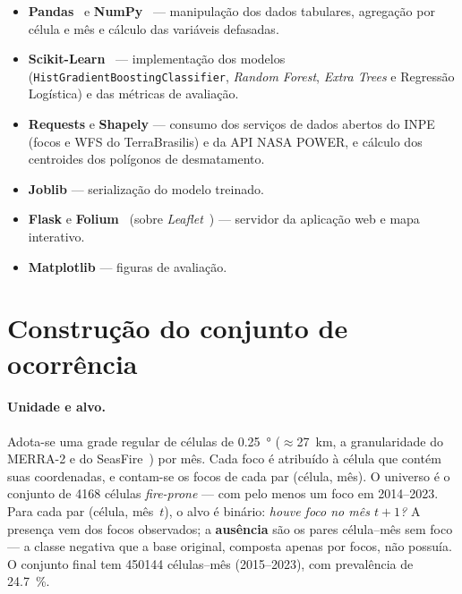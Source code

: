 \documentclass[tcc2]{uftex}
\begin{document}
\begin{itemize}
  \item \textbf{Pandas}~\cite{mckinney2010data} e \textbf{NumPy}~\cite{harris2020numpy} --- manipulação dos dados tabulares, agregação por célula e mês e cálculo das variáveis defasadas.
  \item \textbf{Scikit-Learn}~\cite{pedregosa2011scikit} --- implementação dos modelos (\texttt{HistGradientBoostingClassifier}, \emph{Random Forest}, \emph{Extra Trees} e Regressão Logística) e das métricas de avaliação.
  \item \textbf{Requests} e \textbf{Shapely} --- consumo dos serviços de dados abertos do INPE (focos e WFS do TerraBrasilis) e da API NASA POWER, e cálculo dos centroides dos polígonos de desmatamento.
  \item \textbf{Joblib} --- serialização do modelo treinado.
  \item \textbf{Flask} e \textbf{Folium}~\cite{folium} (sobre \emph{Leaflet}~\cite{leafletjs}) --- servidor da aplicação web e mapa interativo.
  \item \textbf{Matplotlib} --- figuras de avaliação.
\end{itemize}

\section{Construção do conjunto de ocorrência}
\label{sec:metod_conjunto}
\label{sec:oco_metodo}

\paragraph{Unidade e alvo.} Adota-se uma grade regular de células de \SI{0,25}{\degree} (\(\approx\)\SI{27}{km}, a granularidade do MERRA-2 e do SeasFire~\cite{karasante2025firecastnet}) por mês. Cada foco é atribuído à célula que contém suas coordenadas, e contam-se os focos de cada par (célula, mês). O universo é o conjunto de \num{4168} células \emph{fire-prone} --- com pelo menos um foco em 2014--2023. Para cada par (célula, mês~\(t\)), o alvo é binário: \emph{houve foco no mês \(t+1\)?} A presença vem dos focos observados; a \textbf{ausência} são os pares célula--mês sem foco --- a classe negativa que a base original, composta apenas por focos, não possuía. O conjunto final tem \num{450144} células--mês (2015--2023), com prevalência de \SI{24,7}{\percent}.
\end{document}
